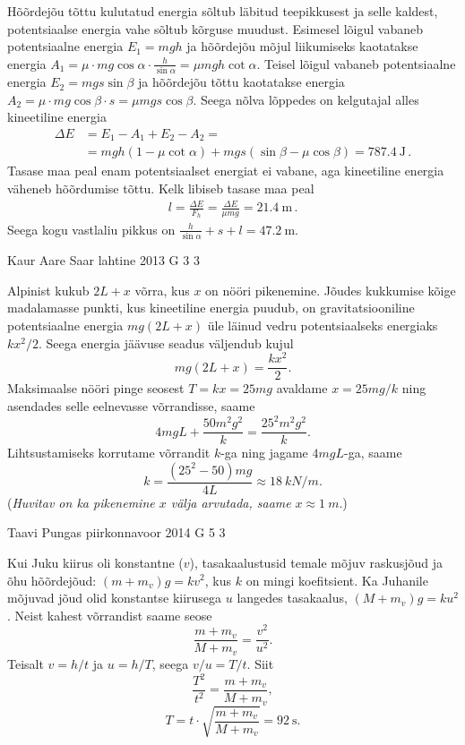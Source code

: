 \documentclass[11pt, twoside]{article}
\begin{document}
{{\ifSolution
Hõõrdejõu tõttu kulutatud energia sõltub läbitud teepikkusest ja selle kaldest, potentsiaalse energia vahe sõltub kõrguse muudust. Esimesel lõigul vabaneb potentsiaalne energia \(E_1 = mgh\) ja hõõrdejõu mõjul liikumiseks kaotatakse energia \( A_1 = \mu \cdot mg\cos\alpha \cdot \frac{h}{\sin\alpha} = \mu mgh \cot\alpha \). Teisel lõigul vabaneb potentsiaalne energia \(E_2 = mgs \sin\beta\) ja hõõrdejõu tõttu kaotatakse energia \( A_2 = \mu \cdot mg \cos \beta \cdot s = \mu mgs \cos \beta \). Seega nõlva lõppedes on kelgutajal alles kineetiline energia
\begin{align*}
\Delta E &= E_1 - A_1 + E_2 - A_2 = \\
&= mgh(1-\mu\cot\alpha) + mgs(\sin\beta - \mu\cos\beta) =  \SI{787.4}{\joule} \, .
\end{align*}
Tasase maa peal enam potentsiaalset energiat ei vabane, aga kineetiline energia väheneb hõõrdumise tõttu. Kelk libiseb tasase maa peal
\begin{align*}
l = \frac{\Delta E}{F_h} = \frac{\Delta E}{\mu mg} = \SI{21.4}{\meter} \, .
\end{align*}
Seega kogu vastlaliu pikkus on \(\frac{h}{\sin\alpha} + s + l = \SI{47.2}{\meter}\).
\fi
}

{Kaur Aare Saar} %
{lahtine} %
{2013} %
{G 3} %
{3} %
{

\ifSolution
Alpinist kukub $2L+x$ võrra, kus $x$ on nööri pikenemine. Jõudes kukkumise kõige madalamasse punkti, kus kineetiline energia puudub, on gravitatsiooniline potentsiaalne energia $mg(2L+x)$ üle läinud vedru potentsiaalseks energiaks $kx^2/2$. Seega energia jäävuse seadus väljendub kujul
\[mg(2L+x)=\frac{kx^2}{2}.\]
Maksimaalse nööri pinge seosest $T=kx=25mg$ avaldame $x=25mg/k$ ning asendades selle eelnevasse võrrandisse, saame
\[4mgL+\frac{50m^2g^2}{k}=\frac{25^2m^2g^2}{k}.\]
Lihtsustamiseks korrutame võrrandit $k$-ga ning jagame $4mgL$-ga, saame
\[k=\frac{(25^2-50)mg}{4L}\approx \SI{18}{kN/m}.\]
({\em Huvitav on ka pikenemine $x$ välja arvutada, saame} $x\approx \SI{1}{m}$.)
\fi
}

{Taavi Pungas} %
{piirkonnavoor} %
{2014} %
{G 5} %
{3} %
{

\ifSolution
Kui Juku kiirus oli konstantne ($v$), tasakaalustusid temale mõjuv raskusjõud ja õhu hõõrdejõud: $(m+m_v)g=kv^2$, kus $k$ on mingi koefitsient. Ka Juhanile mõjuvad jõud olid konstantse kiirusega $u$ langedes tasakaalus, $(M+m_v)g=ku^2$. Neist kahest võrrandist saame seose \[\frac{m+m_v}{M+m_v}=\frac{v^2}{u^2}.\] Teisalt $v=h/t$ ja $u=h/T$, seega $v/u=T/t$. Siit
\[\frac{T^2}{t^2}=\frac{m+m_v}{M+m_v},\]
\[T=t \cdot \sqrt{\frac{m+m_v}{M+m_v}}=\SI{92}{\s}.\]
\fi
}

}
\end{document}
